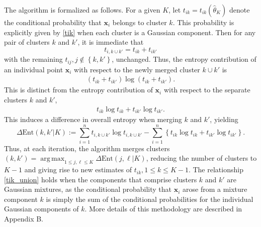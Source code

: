 \documentclass{uwstat572}
\newcommand*\ba{\[ \begin{aligned}}
\newcommand*\ea{\end{aligned} \]}
\newcommand*\set[1]{\left\{#1\right\}}
\newcommand*\estim[1]{\widehat{#1}}
\newcommand*\bx{\mathbf{x}}
\DeclareMathOperator*{\argmax}{arg\;max}
\renewcommand\;{\,}
\begin{document}
The algorithm is formalized as follows.
For a given $K$, let $t_{ik} = t_{ik}\left(\estim\theta_K\right)$ denote the conditional probability that $\bx_i$ belongs to cluster $k$.
This probability is explicitly given by \eqref{tik} when each cluster is a Gaussian component.
Then for any pair of clusters $k$ and $k'$, it is immediate that
\begin{equation}\label{tik_union}
t_{i, k\cup k'} = t_{ik} + t_{ik'}
\end{equation}
with the remaining $t_{ij}, j \not\in \set{k, k'}$, unchanged.
Thus, the entropy contribution of an individual point $\bx_i$ with respect to the newly merged cluster $k \cup k'$ is
\ba
\left(t_{ik} + t_{ik'}\right) \log\left( t_{ik} + t_{ik'} \right).
\ea
This is distinct from the entropy contribution of $\bx_i$ with respect to the separate clusters $k$ and $k'$,
\ba
t_{ik} \log t_{ik} + t_{ik'} \log t_{ik'}.
\ea
This induces a difference in overall entropy when merging $k$ and $k'$, yielding
\begin{equation}\label{delta_ent}
\Delta\text{Ent}( k, k'|K) :=
\sum_{i=1}^n t_{i,k\cup k'} \log t_{i, k \cup k'}
- \sum_{i=1}^n \left\{ t_{ik} \log t_{ik} + t_{ik'} \log t_{ik'} \right\}.
\end{equation}
Thus, at each iteration, the algorithm merges clusters $(k, k') = \argmax_{1 \le j, \ell \le K} \Delta\text{Ent}(j, \ell|K)$, reducing the number of clusters to $K - 1$ and giving rise to new estimates of $t_{ik}, 1 \le k \le K - 1$.
The relationship \eqref{tik_union} holds when the components that comprise clusters $k$ and $k'$ are Gaussian mixtures, as the conditional probability that $\bx_i$ arose from a mixture component $k$ is simply the sum of the conditional probabilities for the individual Gaussian components of $k$.
More details of this methodology are described in Appendix B.
\end{document}
